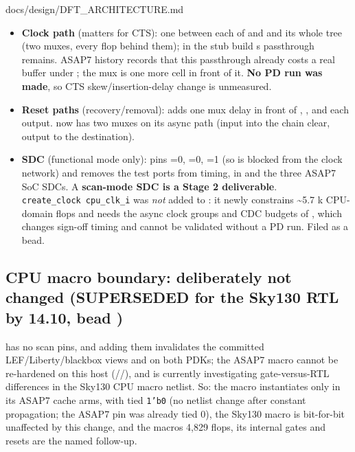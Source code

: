 \begin{relocated}{docs/design/DFT_ARCHITECTURE.md}
\begin{itemize}
\tightlist
\item
  \textbf{Clock path} (matters for CTS): one  between
  each of  and  and its whole tree (two
  muxes, every flop behind them); in the stub build
  \textquotesingle s passthrough remains. ASAP7
  history records that this passthrough already costs a real buffer
  under ; the mux is one more cell in front of
  it. \textbf{No PD run was made}, so CTS
  skew/\allowbreak{}insertion-delay change is unmeasured.
\item
  \textbf{Reset paths} (recovery/\allowbreak{}removal):
   adds one mux delay in front of ,
  ,  and each
   output.  now has two muxes
  on its async path (input into the chain clear, output to the
  destination).
\item
  \textbf{SDC} (functional mode only):  pins
  =0, =0, =1 (so
   is blocked from the clock network) and
   removes the test ports from timing, in
   and the three ASAP7 SoC SDCs. A
  \textbf{scan-mode SDC is a Stage 2 deliverable}.
  \texttt{create\_\allowbreak{}clock\ cpu\_\allowbreak{}clk\_\allowbreak{}i}
  was \emph{not} added to : it newly constrains
  \textasciitilde5.7 k CPU-domain flops and needs the async clock groups
  and CDC budgets of , which changes
  sign-off timing and cannot be validated without a PD run. Filed as a
  bead.
\end{itemize}

\subsection{\texorpdfstring{CPU macro boundary: deliberately not
changed (SUPERSEDED for the Sky130 RTL by 14.10, bead
)}{CPU macro boundary: deliberately not changed (SUPERSEDED for the Sky130 RTL by 14.10, bead )}}\label{tm:ch:dft-architecture:146-cpu-macro-boundary-deliberately-not-changed-superseded-for-the-sky130-rtl-by-1410-bead-j41m4}

 has no scan pins, and adding them invalidates the
committed LEF/\allowbreak{}Liberty/\allowbreak{}blackbox views and
 on both PDKs; the ASAP7 macro cannot be re-hardened
on this host (//), and  is
currently investigating gate-versus-RTL differences in the Sky130 CPU
macro netlist. So: the macro instantiates  only
in its ASAP7 cache arms, with  tied \texttt{1'b0} (no
netlist change after constant propagation; the ASAP7 
 pin was already tied 0), the Sky130 macro is bit-for-bit
unaffected by this change, and the macro\textquotesingle s 4,829 flops,
its internal gates and resets are the named follow-up.


\end{relocated}

